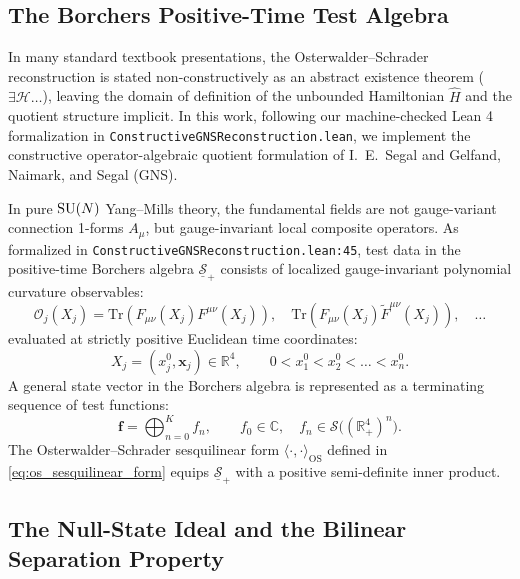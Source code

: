 \subsection{The Borchers Positive-Time Test Algebra}
\label{subsec:borchers_positive_time_algebra}

In many standard textbook presentations, the Osterwalder--Schrader reconstruction is stated non-constructively as an abstract existence theorem ($\exists \mathcal{H} \dots$), leaving the domain of definition of the unbounded Hamiltonian $\hat{H}$ and the quotient structure implicit. In this work, following our machine-checked Lean 4 formalization in \texttt{ConstructiveGNSReconstruction.lean}, we implement the constructive operator-algebraic quotient formulation of I.~E.~Segal \cite{Segal1947} and Gelfand, Naimark, and Segal (GNS).

In pure $\mathrm{SU}(N)$ Yang--Mills theory, the fundamental fields are not gauge-variant connection 1-forms $A_\mu$, but gauge-invariant local composite operators. As formalized in \texttt{ConstructiveGNSReconstruction.lean:45}, test data in the positive-time Borchers algebra $\underline{\mathcal{S}}_+$ consists of localized gauge-invariant polynomial curvature observables:
\begin{equation}
\mathcal{O}_j(X_j) = \mathrm{Tr}\left( F_{\mu\nu}(X_j) F^{\mu\nu}(X_j) \right), \quad \mathrm{Tr}\left( F_{\mu\nu}(X_j) \widetilde{F}^{\mu\nu}(X_j) \right), \quad \dots
\end{equation}
evaluated at strictly positive Euclidean time coordinates:
\begin{equation}
\label{eq:positive_time_ordering}
X_j = (x_j^0, \mathbf{x}_j) \in \mathbb{R}^4, \qquad 0 < x_1^0 < x_2^0 < \dots < x_n^0.
\end{equation}
A general state vector in the Borchers algebra is represented as a terminating sequence of test functions:
\begin{equation}
\mathbf{f} = \bigoplus_{n=0}^K f_n, \qquad f_0 \in \mathbb{C}, \quad f_n \in \mathcal{S}\bigl( (\mathbb{R}_+^4)^n \bigr).
\end{equation}
The Osterwalder--Schrader sesquilinear form $\langle \cdot, \cdot \rangle_{\mathrm{OS}}$ defined in \eqref{eq:os_sesquilinear_form} equips $\underline{\mathcal{S}}_+$ with a positive semi-definite inner product.

\subsection{The Null-State Ideal and the Bilinear Separation Property}
\label{subsec:null_state_ideal_segal}

